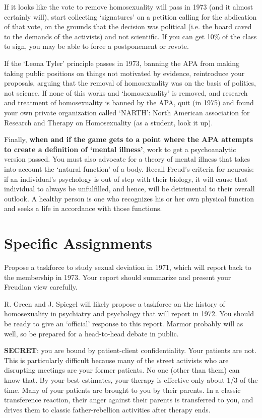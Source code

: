 \begin{refsection}
If it looks like the vote to remove homosexuality will pass in 1973 (and it almost certainly will), start collecting `signatures' on a petition calling for the abdication of that vote, on the grounds that the decision was political (i.e. the board caved to the demands of the activists) and not scientific. If you can get 10\% of the class to sign, you may be able to force a postponement or revote.

If the `Leona Tyler' principle passes in 1973, banning the APA from making taking public positions on things not motivated by evidence, reintroduce your proposals, arguing that the removal of homosexuality was on the basis of politics, not science. If none of this works and `homosexuality' is removed, and research and treatment of homosexuality is banned by the APA, quit (in 1975) and found your own private organization called `NARTH': North American association for Research and Therapy on Homosexuality (as a student, look it up).

Finally, \textbf{when and if the game gets to a point where the APA attempts to create a definition of `mental illness'}, work to get a psychoanalytic version passed. You must also advocate for a theory of mental illness that takes into account the `natural function' of a body. Recall Freud's criteria for neurosis: if an individual's psychology is out of step with their biology, it will cause that individual to always be unfulfilled, and hence, will be detrimental to their overall outlook. A healthy person is one who recognizes his or her own physical function and seeks a life in accordance with those functions.

\section{Specific Assignments}
\label{specificassignments}

Propose a taskforce to study sexual deviation in 1971, which will report back to the membership in 1973. Your report should summarize and present your Freudian view carefully.

R. Green and J. Spiegel will likely propose a taskforce on the history of homosexuality in psychiatry and psychology that will report in 1972. You should be ready to give an `official' response to this report. Marmor probably will as well, so be prepared for a head-to-head debate in public.

\textbf{SECRET}: you are bound by patient-client confidentiality. Your patients are not. This is particularly difficult because many of the street activists who are disrupting meetings are your former patients. No one (other than them) can know that. By your best estimates, your therapy is effective only about 1\slash 3 of the time. Many of your patients are brought to you by their parents. In a classic transference reaction, their anger against their parents is transferred to you, and drives them to classic father-rebellion activities after therapy ends. 


\end{refsection}
